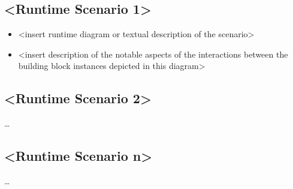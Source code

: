 \subsection{\textless Runtime Scenario 1\textgreater}
\begin{itemize}
  \item \textless insert runtime diagram or textual description of the scenario\textgreater
  \item \textless insert description of the notable aspects of the interactions between the building block instances depicted in this diagram\textgreater
\end{itemize}

\subsection{\textless Runtime Scenario 2\textgreater}
\dots

\subsection{\textless Runtime Scenario n\textgreater}
\dots

